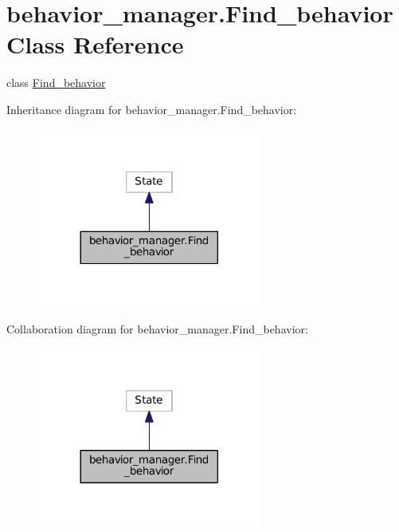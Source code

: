 \hypertarget{classbehavior__manager_1_1Find__behavior}{}\section{behavior\+\_\+manager.\+Find\+\_\+behavior Class Reference}
\label{classbehavior__manager_1_1Find__behavior}


class \hyperlink{classbehavior__manager_1_1Find__behavior}{Find\+\_\+behavior}  




Inheritance diagram for behavior\+\_\+manager.\+Find\+\_\+behavior\+:
\nopagebreak
\begin{figure}[H]
\begin{center}
\leavevmode
\includegraphics[width=209pt]{classbehavior__manager_1_1Find__behavior__inherit__graph}
\end{center}
\end{figure}


Collaboration diagram for behavior\+\_\+manager.\+Find\+\_\+behavior\+:
\nopagebreak
\begin{figure}[H]
\begin{center}
\leavevmode
\includegraphics[width=209pt]{classbehavior__manager_1_1Find__behavior__coll__graph}
\end{center}
\end{figure}
